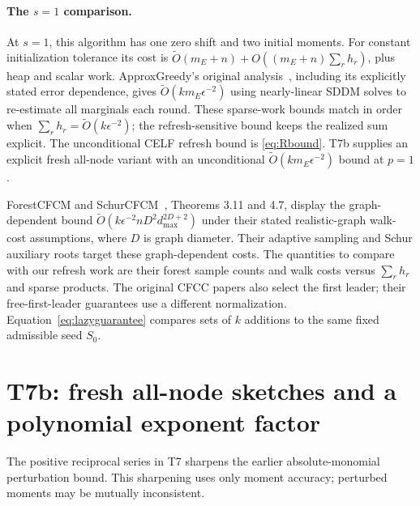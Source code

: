 \documentclass[11pt]{article}
\begin{document}
\paragraph{The $s=1$ comparison.}
At $s=1$, this algorithm has one zero shift and two initial moments.
For constant initialization tolerance its cost is
$\widetilde O(m_E+n)+O((m_E+n)\sum_r h_r)$, plus heap and scalar
work. ApproxGreedy's original analysis~\cite{li2019}, including
its explicitly stated error dependence, gives
$\widetilde O(km_E\epsilon^{-2})$ using nearly-linear SDDM solves
to re-estimate all marginals each round. These sparse-work bounds
match in order when $\sum_r h_r=\widetilde O(k\epsilon^{-2})$;
the refresh-sensitive bound keeps the realized sum explicit.
The unconditional CELF refresh bound is \eqref{eq:Rbound}.
T7b supplies an explicit fresh all-node variant with an unconditional
$\widetilde O(km_E\epsilon^{-2})$ bound at $p=1$.

ForestCFCM and SchurCFCM~\cite{xia2025}, Theorems 3.11 and 4.7,
display the graph-dependent bound
$\widetilde O(k\epsilon^{-2}n D^2d_{\max}^{2D+2})$ under their
stated realistic-graph walk-cost assumptions, where $D$ is graph
diameter. Their adaptive sampling and Schur auxiliary roots target
these graph-dependent costs. The quantities to compare with our
refresh work are their forest sample counts and walk costs versus
$\sum_r h_r$ and sparse products. The original CFCC papers also
select the first leader; their free-first-leader guarantees use a
different normalization. Equation~\eqref{eq:lazyguarantee} compares
sets of $k$ additions to the same fixed admissible seed $S_0$.

\section{T7b: fresh all-node sketches and a polynomial exponent factor}
The positive reciprocal series in T7 sharpens the earlier
absolute-monomial perturbation bound. This sharpening uses only
moment accuracy; perturbed moments may be mutually inconsistent.
\end{document}
